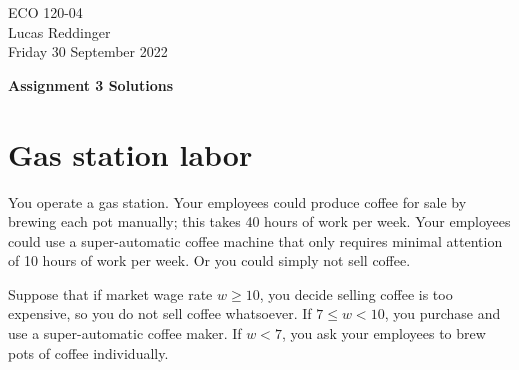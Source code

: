 \documentclass[
    letterpaper,paper=portrait,fleqn,
    DIV=16,fontsize=12pt,twoside=semi,
    parskip=full-,
    headings=standardclasses]
{scrartcl}
\begin{document}
\RaggedRight
\thispagestyle{plain}

ECO 120-04 \\
Lucas Reddinger \\
Friday 30 September 2022

\vspace{0.7\baselineskip}
\textbf{\LARGE Assignment 3 Solutions}

\section*{Gas station labor}

You operate a gas station. Your employees could produce coffee for sale by brewing each pot manually; this takes 40 hours of work per week. Your employees could use a super-automatic coffee machine that only requires minimal attention of 10 hours of work per week. Or you could simply not sell coffee.

Suppose that if market wage rate $w\geq10$, you decide selling coffee is too expensive, so you do not sell coffee whatsoever. If $7 \leq w < 10$, you purchase and use a super-automatic coffee maker. If $w < 7$, you ask your employees to brew pots of coffee individually.
\end{document}
